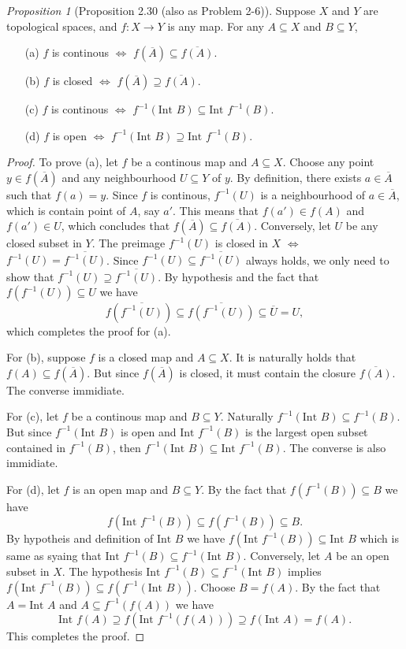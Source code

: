 \documentclass[a4paper]{article}
\theoremstyle{remark}
\newtheorem{prop}{Proposition}
\newcommand{\subhim}{\subseteq} %
\begin{document}
\begin{prop}[Proposition 2.30 \cite{LeeTM} (also as Problem 2-6)]
	Suppose $X$ and $Y$ are topological spaces, and $f : X \to Y$ is any map. For any $A \subhim X$ and $B \subhim Y$,
	\begin{enumerate}[nolistsep]
		\item[(a)] $f$ is continous $\Leftrightarrow$ $f(\overline{A}) \subhim \overline{f(A)}$.
		\item[(b)] $f$ is closed $\Leftrightarrow$ $f(\overline{A}) \supseteq \overline{f(A)}$.
		\item[(c)] $f$ is continous $\Leftrightarrow$ $f^{-1}(\text{Int }B) \subhim \text{Int }f^{-1}(B)$.
		\item[(d)] $f$ is open $\Leftrightarrow$ $f^{-1}(\text{Int }B) \supseteq \text{Int }f^{-1}(B)$.
	\end{enumerate} 
\end{prop}
\begin{proof}
	To prove (a), let $f$ be a continous map and $A\subhim X$. Choose any point $y\in f(\overline{A})$ and any neighbourhood $U\subhim Y$ of $y$. By definition, there exists $a \in \overline{A}$ such that $f(a)=y$. Since $f$ is continous, $f^{-1}(U)$ is a neighbourhood of $a \in \overline{A}$, which is contain point of $A$, say $a'$. This means that $f(a') \in f(A)$ and $f(a') \in U$, which concludes that $f(\overline{A}) \subhim \overline{f(A)}$. Conversely, let $U$ be any closed subset in $Y$. The preimage $f^{-1}(U)$ is closed in $X$ $\Leftrightarrow$ $f^{-1}(U) = \overline{f^{-1}(U)}$. Since $f^{-1}(U) \subhim \overline{f^{-1}(U)}$ always holds, we only need to show that $f^{-1}(U) \supseteq \overline{f^{-1}(U)}$. By hypothesis and the fact that $f(f^{-1}(U)) \subhim U$ we have 
	$$
	f(\overline{f^{-1}(U)}) \subhim \overline{f(f^{-1}(U))} \subhim \overline{U} = U,
	$$
	which completes the proof for (a).
	
	For (b), suppose $f$ is a closed map and $A \subhim X$. It is naturally holds that $f(A) \subhim f(\overline{A})$. But since $f(\overline{A})$ is closed, it must contain the closure $\overline{f(A)}$. The converse immidiate.
	
	For (c), let $f$ be a continous map and $B \subhim Y$. Naturally $f^{-1}(\text{Int }B) \subhim f^{-1}(B)$. But since $f^{-1}(\text{Int }B)$ is open and $\text{Int }f^{-1}(B)$ is the largest open subset contained in $f^{-1}(B)$, then $f^{-1}(\text{Int }B) \subhim \text{Int }f^{-1}(B)$. The converse is also immidiate.
	
	For (d), let $f$ is an open map and $B \subhim Y$. By the fact that $f(f^{-1}(B)) \subhim B$ we have
	$$
	f(\text{Int }f^{-1}(B)) \subhim f(f^{-1}(B)) \subhim B.
	$$
	By hypotheis and definition of $\text{Int }B$ we have $f(\text{Int }f^{-1}(B)) \subhim \text{Int }B$ which is same as syaing that $\text{Int }f^{-1}(B) \subhim f^{-1}(\text{Int }B)$. Conversely, let $A$ be an open subset in $X$. The hypothesis $\text{Int }f^{-1}(B) \subhim f^{-1}(\text{Int }B)$ implies $f(\text{Int }f^{-1}(B)) \subhim f(f^{-1}(\text{Int }B))$. Choose $B = f(A)$. By the fact that $A = \text{Int }A$ and $A \subhim f^{-1}(f(A))$ we have
	$$
	\text{Int }f(A) \supseteq f(\text{Int }f^{-1}(f(A))) \supseteq f(\text{Int }A) = f(A).
	$$
	This completes the proof.  
\end{proof}
\end{document}
